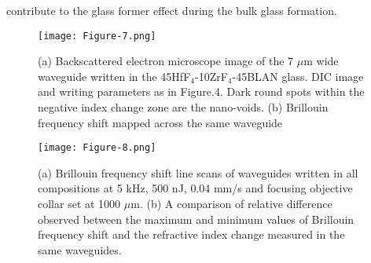 \documentclass[11pt]{article}
\begin{document}
contribute to the glass former effect during the bulk glass formation. 

\begin{figure}[ht]
\centering
\texttt{[image: Figure-7.png]}\caption{(a) Backscattered electron microscope image of the 7 $\mu$m wide waveguide written in the 45HfF$_4$-10ZrF$_4$-45BLAN glass. DIC image and writing parameters as in Figure.4. Dark round spots within the negative index change zone are the nano-voids. (b) Brillouin frequency shift mapped across the same waveguide }
\label{EPMA-BFS}
\end{figure}

\begin{figure}[ht]
\centering
\texttt{[image: Figure-8.png]}
     \caption{(a) Brillouin frequency shift line scans of waveguides written in all compositions at 5 kHz, 500 nJ, 0.04 mm/s and focusing objective collar set at 1000 $\mu$m. (b) A comparison of relative difference observed between the maximum and minimum values of Brillouin frequency shift and the refractive index change measured in the same waveguides.}
\label{BFS-linescans}
\end{figure}
\end{document}
